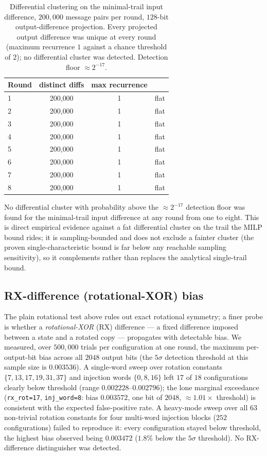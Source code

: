 \documentclass[11pt]{article}
\begin{document}
\begin{table}[h]
\centering
\begin{tabular}{lccl}
  \toprule
  \textbf{Round} & \textbf{distinct diffs} & \textbf{max recurrence} & \textbf{} \\
  \midrule
  1 & 200{,}000 & 1 & flat \\
  2 & 200{,}000 & 1 & flat \\
  3 & 200{,}000 & 1 & flat \\
  4 & 200{,}000 & 1 & flat \\
  5 & 200{,}000 & 1 & flat \\
  6 & 200{,}000 & 1 & flat \\
  7 & 200{,}000 & 1 & flat \\
  8 & 200{,}000 & 1 & flat \\
  \bottomrule
\end{tabular}
\caption{Differential clustering on the minimal-trail input difference,
$200{,}000$ message pairs per round, $128$-bit output-difference projection. Every
projected output difference was unique at every round (maximum recurrence $1$
against a chance threshold of $2$); no differential cluster was detected. Detection
floor $\approx 2^{-17}$.}
\end{table}

No differential cluster with probability above the $\approx 2^{-17}$ detection
floor was found for the minimal-trail input difference at any round from one to
eight. This is direct empirical evidence against a fat differential cluster on the
trail the MILP bound rides; it is sampling-bounded and does not exclude a fainter
cluster (the proven single-characteristic bound is far below any reachable
sampling sensitivity), so it complements rather than replaces the analytical
single-trail bound.

\subsection{RX-difference (rotational-XOR) bias}
The plain rotational test above rules out exact rotational symmetry; a finer
probe is whether a \emph{rotational-XOR} (RX) difference --- a fixed difference
imposed between a state and a rotated copy --- propagates with detectable bias.
We measured, over $500{,}000$ trials per configuration at one round, the maximum
per-output-bit bias across all $2048$ output bits (the $5\sigma$ detection
threshold at this sample size is $0.003536$). A single-word sweep over rotation
constants $\{7,13,17,19,31,37\}$ and injection words $\{0,8,16\}$ left $17$ of
$18$ configurations clearly below threshold (range $0.002228$--$0.002796$); the
lone marginal exceedance (\texttt{rx\_rot=17}, \texttt{inj\_word=8}: bias
$0.003572$, one bit of $2048$, $\approx\!1.01\times$ threshold) is consistent
with the expected false-positive rate. A heavy-mode sweep over all $63$
non-trivial rotation constants for four multi-word injection blocks ($252$
configurations) failed to reproduce it: every configuration stayed below
threshold, the highest bias observed being $0.003472$ ($1.8\%$ below the
$5\sigma$ threshold). No RX-difference distinguisher was detected.
\end{document}
